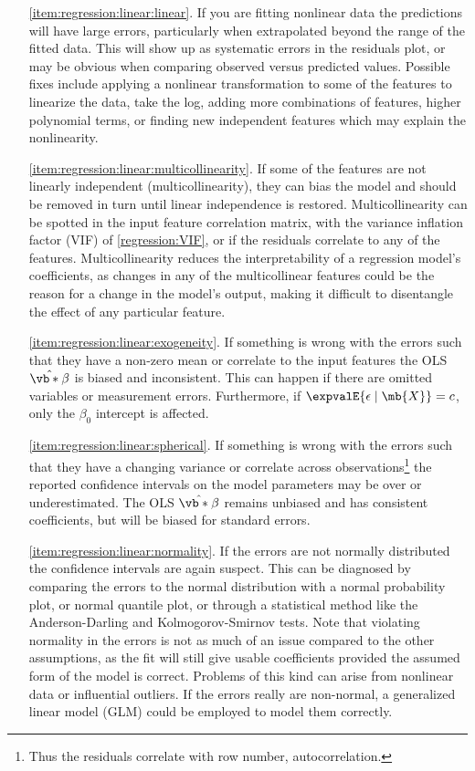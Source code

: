 \begin{itemize}[noitemsep]
  \item[\cref{item:regression:linear:linear}.] If you are fitting nonlinear data the predictions will have large errors,
particularly when extrapolated beyond the range of the fitted data.
This will show up as systematic errors in the residuals plot,
or may be obvious when comparing observed versus predicted values.
Possible fixes include applying a nonlinear transformation to some of the features to linearize the data, \eg take the log,
adding more combinations of features, \eg higher polynomial terms,
or finding new independent features which may explain the nonlinearity.

  \item[\cref{item:regression:linear:multicollinearity}.] If some of the features are not linearly independent (multicollinearity),
they can bias the model and should be removed in turn until linear independence is restored.
Multicollinearity can be spotted in the input feature correlation matrix,
with the variance inflation factor (VIF) of \cref{regression:VIF},
or if the residuals correlate to any of the features.
Multicollinearity reduces the interpretability of a regression model's coefficients,
as changes in any of the multicollinear features could be the reason for a change in the model's output,
making it difficult to disentangle the effect of any particular feature.

  \item[\cref{item:regression:linear:exogeneity}.] If something is wrong with the errors
such that they have a non-zero mean or correlate to the input features
the OLS $\hat{\vb*{\beta}}$ is biased and inconsistent.
This can happen if there are omitted variables or measurement errors.
Furthermore, if $\expvalE{\epsilon \mid \mb{X}} = c$, only the $\beta_{0}$ intercept is affected.

  \item[\cref{item:regression:linear:spherical}.] If something is wrong with the errors
such that they have a changing variance or correlate across observations\footnote{Thus the residuals correlate with row number, \ie autocorrelation.}
the reported confidence intervals on the model parameters may be over or underestimated.
The OLS $\hat{\vb*{\beta}}$ remains unbiased and has consistent coefficients, but will be biased for standard errors.

  \item[\cref{item:regression:linear:normality}.] If the errors are not normally distributed the confidence intervals are again suspect.
This can be diagnosed by comparing the errors to the normal distribution with a normal probability plot, or normal quantile plot,
or through a statistical method like the Anderson-Darling and Kolmogorov-Smirnov tests.
Note that violating normality in the errors is not as much of an issue compared to the other assumptions,
as the fit will still give usable coefficients provided the assumed form of the model is correct.
Problems of this kind can arise from nonlinear data or influential outliers.
If the errors really are non-normal, a generalized linear model (GLM) could be employed to model them correctly.
\end{itemize}


